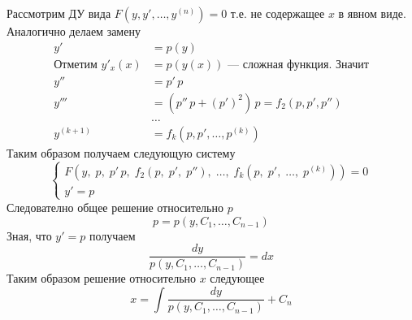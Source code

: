 \begin{Note}
    Рассмотрим ДУ вида $F(y, y', \dots, y^{(n)}) = 0$ т.е. не содержащее $x$ в явном виде.\\
    Аналогично делаем замену
    \begin{align*}
        y' &= p(y)\\
        \text{Отметим } y'_x(x) &= p(y(x)) \text{ --- сложная функция. Значит}\\
        y''&=  p'\,p\\
        y''' &= (p'' \, p + (p')^2)\,p = f_2(p, p', p'')\\
        &\dots\\
        y^{(k + 1)} &= f_k(p, p', \dots, p^{(k)})
    \end{align*}
    Таким образом получаем следующую систему
    \[
        \begin{cases}
            F(y,\; p,\; p'\,p,\; f_2(p,\; p',\; p''),\; \dots,\; f_k(p,\; p',\; \dots,\; p^{(k)})) = 0\\
            y' = p
        \end{cases}
    \]
    Следователно общее решение относительно $p$
    \[
        p = p(y, C_1, \dots, C_{n-1})
    \]
    Зная, что $y' = p$ получаем
    \[
        \frac{dy}{p(y, C_1, \dots, C_{n-1})} = dx
    \]
    Таким образом решение относительно $x$ следующее
    \[
        x = \int \frac{dy}{p(y, C_1, \dots, C_{n-1})} + C_n
    \]
\end{Note}

